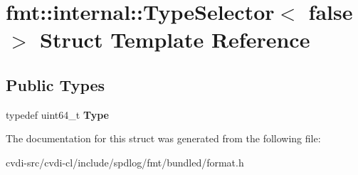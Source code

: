 \hypertarget{structfmt_1_1internal_1_1TypeSelector_3_01false_01_4}{}\section{fmt\+:\+:internal\+:\+:Type\+Selector$<$ false $>$ Struct Template Reference}
\label{structfmt_1_1internal_1_1TypeSelector_3_01false_01_4}
\subsection*{Public Types}
\begin{DoxyCompactItemize}
\item 
typedef uint64\+\_\+t {\bfseries Type}\hypertarget{structfmt_1_1internal_1_1TypeSelector_3_01false_01_4_af959045b66d5539844a829910e1bd13e}{}\label{structfmt_1_1internal_1_1TypeSelector_3_01false_01_4_af959045b66d5539844a829910e1bd13e}

\end{DoxyCompactItemize}


The documentation for this struct was generated from the following file\+:\begin{DoxyCompactItemize}
\item 
cvdi-\/src/cvdi-\/cl/include/spdlog/fmt/bundled/format.\+h\end{DoxyCompactItemize}
